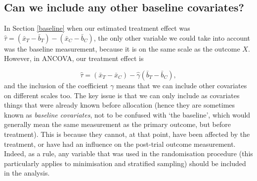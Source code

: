 \documentclass[
  openany]{book}
\theoremstyle{definition}
\theoremstyle{definition}
\theoremstyle{definition}
\theoremstyle{definition}
\theoremstyle{remark}
\begin{document}
\subsection{Can we include any other baseline covariates?}\label{can-we-include-any-other-baseline-covariates}

In Section \ref{baseline} when our estimated treatment effect was \(\hat\tau = \left(\bar{x}_T - \bar{b}_T\right) - \left(\bar{x}_C - \bar{b}_C\right)\), the only other variable we could take into account was the baseline measurement, because it is on the same scale as the outcome \(X\). However, in ANCOVA, our treatment effect is

\[ \hat\tau = \left(\bar{x}_T - \bar{x}_C\right) - \hat\gamma\left(\bar{b}_T - \bar{b}_C\right), \]
and the inclusion of the coefficient \(\gamma\) means that we can include other covariates on different scales too. The key issue is that we can only include as covariates things that were already known before allocation (hence they are sometimes known as \emph{baseline covariates}, not to be confused with `the baseline', which would generally mean the same measurement as the primary outcome, but before treatment). This is because they cannot, at that point, have been affected by the treatment, or have had an influence on the post-trial outcome measurement. Indeed, as a rule, any variable that was used in the randomisation procedure (this particularly applies to minimisation and stratified sampling) should be included in the analysis.
\end{document}
